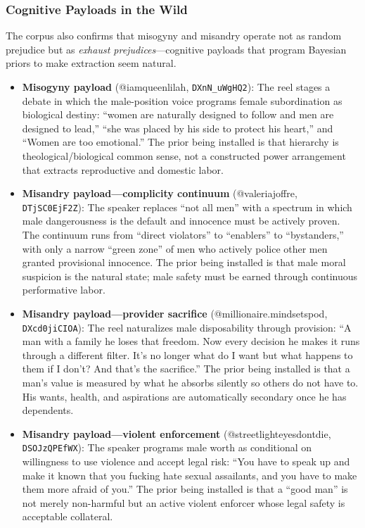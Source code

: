 \documentclass[12pt]{article}
\begin{document}
\subsubsection{Cognitive Payloads in the Wild}

The corpus also confirms that misogyny and misandry operate not as random prejudice but as \textit{exhaust prejudices}---cognitive payloads that program Bayesian priors to make extraction seem natural.

\begin{itemize}
  \item \textbf{Misogyny payload} (@iamqueenlilah, \texttt{DXnN\_uWgHQ2}): The reel stages a debate in which the male-position voice programs female subordination as biological destiny: ``women are naturally designed to follow and men are designed to lead,'' ``she was placed by his side to protect his heart,'' and ``Women are too emotional.'' The prior being installed is that hierarchy is theological/biological common sense, not a constructed power arrangement that extracts reproductive and domestic labor.
  
  \item \textbf{Misandry payload---complicity continuum} (@valeriajoffre, \texttt{DTjSC0EjF2Z}): The speaker replaces ``not all men'' with a spectrum in which male dangerousness is the default and innocence must be actively proven. The continuum runs from ``direct violators'' to ``enablers'' to ``bystanders,'' with only a narrow ``green zone'' of men who actively police other men granted provisional innocence. The prior being installed is that male moral suspicion is the natural state; male safety must be earned through continuous performative labor.
  
  \item \textbf{Misandry payload---provider sacrifice} (@millionaire.mindsetspod, \texttt{DXcd0jiCIOA}): The reel naturalizes male disposability through provision: ``A man with a family he loses that freedom. Now every decision he makes it runs through a different filter. It's no longer what do I want but what happens to them if I don't? And that's the sacrifice.'' The prior being installed is that a man's value is measured by what he absorbs silently so others do not have to. His wants, health, and aspirations are automatically secondary once he has dependents.
  
  \item \textbf{Misandry payload---violent enforcement} (@streetlighteyesdontdie, \texttt{DSOJzQPEfWX}): The speaker programs male worth as conditional on willingness to use violence and accept legal risk: ``You have to speak up and make it known that you fucking hate sexual assailants, and you have to make them more afraid of you.'' The prior being installed is that a ``good man'' is not merely non-harmful but an active violent enforcer whose legal safety is acceptable collateral.
\end{itemize}
\end{document}
